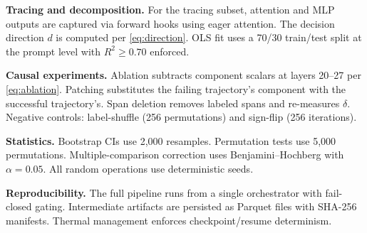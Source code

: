 \documentclass{article}
\begin{document}
\textbf{Tracing and decomposition.}  For the tracing subset, attention and MLP outputs are captured via forward hooks using eager attention.  The decision direction $d$ is computed per \cref{eq:direction}.  OLS fit uses a 70/30 train/test split at the prompt level with $R^2 \geq 0.70$ enforced.

\textbf{Causal experiments.}  Ablation subtracts component scalars at layers 20--27 per \cref{eq:ablation}.  Patching substitutes the failing trajectory's component with the successful trajectory's.  Span deletion removes labeled spans and re-measures $\delta$.  Negative controls: label-shuffle (256 permutations) and sign-flip (256 iterations).

\textbf{Statistics.}  Bootstrap CIs use 2{,}000 resamples.  Permutation tests use 5{,}000 permutations.  Multiple-comparison correction uses Benjamini--Hochberg with $\alpha = 0.05$.  All random operations use deterministic seeds.

\textbf{Reproducibility.}  The full pipeline runs from a single orchestrator with fail-closed gating.  Intermediate artifacts are persisted as Parquet files with SHA-256 manifests.  Thermal management enforces checkpoint/resume determinism.
\end{document}
